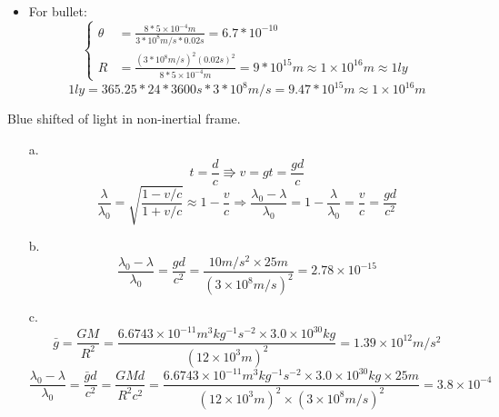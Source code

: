 \documentclass[11pt,fleqn]{book} %
\begin{document}
\begin{problem}
\begin{enumerate}
\begin{itemize}
	\item For bullet:
	\begin{equation}
		\begin{cases}
			\theta &= \frac{8*5\times 10^{-4}m}{3*10^8 m/s *0.02s} =  6.7*10^{-10}\\
			R &= \frac{(3*10^8 m/s)^2 (0.02s)^2}{8*5\times 10^{-4}m} = 9*10^{15} m \approx 1\times 10^{16}m \approx 1ly
		\end{cases}
	\end{equation}
\begin{equation}\label{key}
	1 ly = 365.25 * 24 * 3600s * 3*10^8 m/s = 9.47*10^{15} m \approx 1\times 10^{16}m 
\end{equation}
\end{itemize}
\end{enumerate}
\end{problem}

\begin{problem}
	Blue shifted of light in non-inertial frame.\\
	\begin{enumerate}
		\item[a.]
		\begin{equation}
			t = \frac{d}{c} \Rrightarrow v = gt = \frac{gd}{c}
		\end{equation}
	\begin{equation}
	\frac{\lambda}{\lambda_0} = \sqrt{\frac{1-v/c}{1+v/c}} \approx 1 - \frac{v}{c} \Rightarrow \frac{\lambda_0 - \lambda}{\lambda_0} = 1 - \frac{\lambda}{\lambda_0} =  \frac{v}{c} = \frac{gd}{c^2}
	\end{equation}
		
		\item[b.] 
		\begin{equation} \frac{\lambda_0 - \lambda}{\lambda_0} = \frac{gd}{c^2} = \frac{10m/s^2 \times 25m}{(3\times 10^8m/s)^2} = 2.78 \times 10^{-15}
		\end{equation}
	
		\item[c.] 
		\begin{equation}\label{gbar}
			\bar{g} = \frac{GM}{R^2} = \frac{6.6743\times 10^{-11} m^3 kg^{-1} s^{-2} \times 3.0\times 10^{30}kg}{(12\times 10^3m)^2} = 1.39 \times 10^{12} m/s^2
		\end{equation}
	\begin{equation} 
		\frac{\lambda_0 - \lambda}{\lambda_0} = \frac{\bar{g}d}{c^2} = \frac{GMd}{R^2 c^2} = \frac{6.6743\times 10^{-11} m^3 kg^{-1} s^{-2} \times 3.0\times 10^{30}kg \times 25m}{(12\times 10^3m)^2 \times (3\times 10^8m/s)^2} = 3.8 \times 10^{-4} 
	\end{equation}
	\end{enumerate}
\end{problem}
\end{document}
